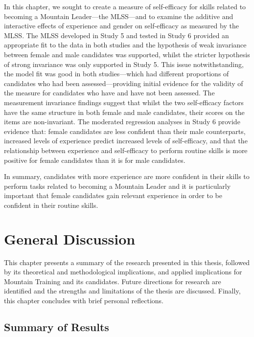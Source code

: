 \documentclass[
  12pt,
  a4paper,
]{book}
\begin{document}
In this chapter, we sought to create a measure of self-efficacy for skills related to becoming a Mountain Leader---the MLSS---and to examine the additive and interactive effects of experience and gender on self-efficacy as measured by the MLSS. The MLSS developed in Study 5 and tested in Study 6 provided an appropriate fit to the data in both studies and the hypothesis of weak invariance between female and male candidates was supported, whilst the stricter hypothesis of strong invariance was only supported in Study 5. This issue notwithstanding, the model fit was good in both studies---which had different proportions of candidates who had been assessed---providing initial evidence for the validity of the measure for candidates who have and have not been assessed. The measurement invariance findings suggest that whilst the two self-efficacy factors have the same structure in both female and male candidates, their scores on the items are non-invariant. The moderated regression analyses in Study 6 provide evidence that: female candidates are less confident than their male counterparts, increased levels of experience predict increased levels of self-efficacy, and that the relationship between experience and self-efficacy to perform routine skills is more positive for female candidates than it is for male candidates.

In summary, candidates with more experience are more confident in their skills to perform tasks related to becoming a Mountain Leader and it is particularly important that female candidates gain relevant experience in order to be confident in their routine skills.

\hypertarget{general-discussion}{%
\chapter{General Discussion}\label{general-discussion}}

This chapter presents a summary of the research presented in this thesis, followed by its theoretical and methodological implications, and applied implications for Mountain Training and its candidates. Future directions for research are identified and the strengths and limitations of the thesis are discussed. Finally, this chapter concludes with brief personal reflections.

\hypertarget{general-discussion-summary-of-results}{%
\section{Summary of Results}\label{general-discussion-summary-of-results}}
\end{document}
